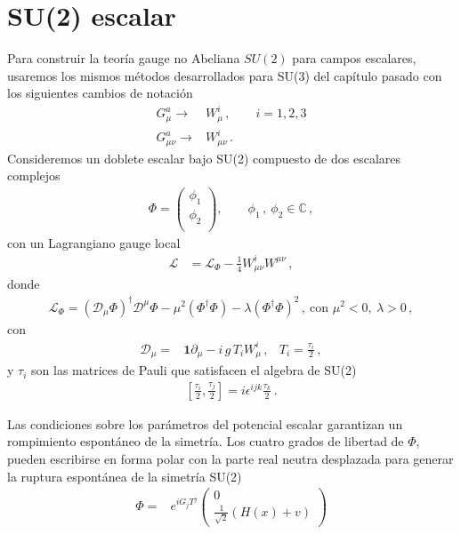 \section{SU(2) escalar}
\begin{frame}
Para construir la teoría gauge no Abeliana $SU(2)$ para campos escalares, usaremos los mismos métodos desarrollados para SU(3) del capítulo pasado con los siguientes cambios de notación
\begin{align}
  G_{\mu}^a \to& W_{\mu}^{i}\,,\qquad i=1,2,3 \nonumber\\
  G_{\mu\nu}^a \to& W_{\mu\nu}^{i}\,.
\end{align}
Consideremos un doblete escalar bajo SU(2) compuesto de dos escalares complejos
\begin{align}
  \Phi=  \begin{pmatrix}
    \phi_1\\
     \phi_2\\
  \end{pmatrix},\qquad \phi_1\,,\ \phi_2\in \mathbb{C}\,,
\end{align}
con un Lagrangiano gauge local
\begin{align}
  \mathcal{L}&=\mathcal{L}_\Phi-\frac{1}{4}W_{\mu\nu}^{i}W^{\mu\nu}\,,
\end{align}
donde
\begin{align}
 \mathcal{L}_\Phi= \left( \mathcal{D}_{\mu} \Phi\right)^{\dagger}\mathcal{D}^{\mu} \Phi-
\mu^2 \left( \Phi^{\dagger} \Phi\right)-\lambda \left( \Phi^{\dagger} \Phi\right)^2\,,\ \text{con $\mu^2<0,\ \lambda>0$}\,,
\end{align}
con
\begin{align}
  \mathcal{D}_{\mu}=&\boldsymbol{1}\partial_{\mu}-i\,g\,T_i W^i_{\mu}\,,& T_i=\frac{\tau_i}{2}\,,
\end{align}
y $\tau_i$ son las matrices de Pauli que satisfacen el algebra de SU(2)
\begin{align}
  \left[ \frac{\tau_i}{2},\frac{\tau_j}{2} \right]=i\epsilon^{ijk}\frac{\tau_k}{2}\,.
\end{align}

Las condiciones sobre los parámetros del potencial escalar garantizan un rompimiento espontáneo de la simetría. Los cuatro grados de libertad de $\Phi$, pueden escribirse en forma polar con la parte real neutra desplazada para generar la ruptura espontánea de la simetría SU(2)
\begin{align}
\label{eq:92qft}
  {\Phi}=&e^{i G_jT^j}
  \begin{pmatrix}
    0\\
    \frac{1}{\sqrt{2}}(H(x)+v)
  \end{pmatrix}\\
\end{align}
\end{frame}
